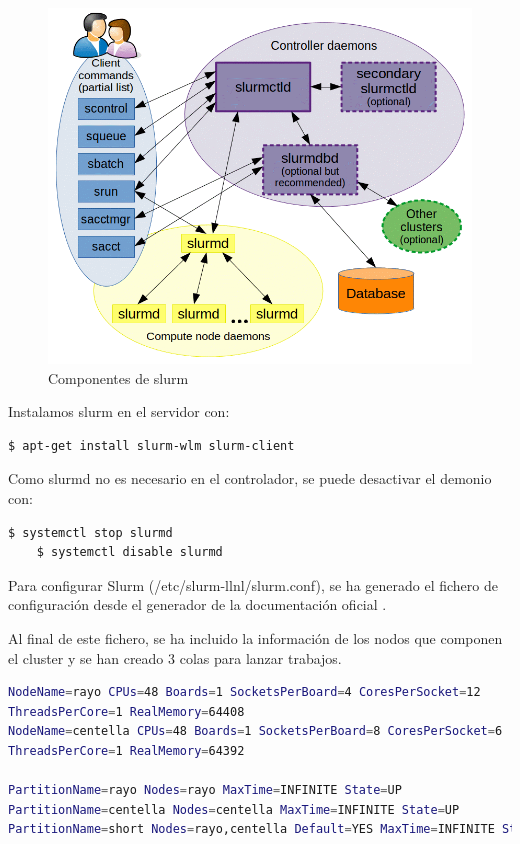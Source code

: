 \begin{figure}[htb]
   \centering
   \includegraphics[scale=0.3]{images/slurmcomponents.png}
   \caption{Componentes de slurm}
   \label{nfs:server}
\end{figure}
\vspace{4mm}
Instalamos slurm en el servidor con:
\vspace{2mm}
\begin{lstlisting}[language=bash]
    $ apt-get install slurm-wlm slurm-client
\end{lstlisting}
\vspace{2mm}
Como slurmd no es necesario en el controlador, se puede desactivar el demonio con:
\vspace{2mm}
\begin{lstlisting}[language=bash]
    $ systemctl stop slurmd
    $ systemctl disable slurmd
\end{lstlisting}
\vspace{2mm}

Para configurar Slurm (/etc/slurm-llnl/slurm.conf), se ha generado el fichero de configuración desde el generador de la documentación oficial \cite{slurmconfiguration}.
\vspace{4mm}

Al final de este fichero, se ha incluido la información de los nodos que componen el cluster y se han creado 3 colas para lanzar trabajos.
\vspace{2mm}

\vspace{2mm}
\begin{lstlisting}[language=bash,caption={Fichero /etc/slurm-llnl/slurm.conf}]
NodeName=rayo CPUs=48 Boards=1 SocketsPerBoard=4 CoresPerSocket=12 
ThreadsPerCore=1 RealMemory=64408
NodeName=centella CPUs=48 Boards=1 SocketsPerBoard=8 CoresPerSocket=6 
ThreadsPerCore=1 RealMemory=64392

PartitionName=rayo Nodes=rayo MaxTime=INFINITE State=UP
PartitionName=centella Nodes=centella MaxTime=INFINITE State=UP
PartitionName=short Nodes=rayo,centella Default=YES MaxTime=INFINITE State=UP
\end{lstlisting}
\vspace{2mm}

